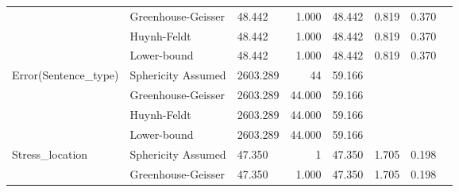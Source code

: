 \documentclass[a4paper]{article}
\begin{document}
\begin{table}[H]
\begin{center}
\begin{tabular}{p{}p{}|l|r|r|r|r|r|}
\cline{2-7}
                                                        & Greenhouse-Geisser & 48.442                                       & 1.000                   & 48.442                           & 0.819                  & 0.370                      \\ 
\cline{2-7}
                                                        & Huynh-Feldt        & 48.442                                       & 1.000                   & 48.442                           & 0.819                  & 0.370                      \\ 
\cline{2-7}
                                                        & Lower-bound        & 48.442                                       & 1.000                   & 48.442                           & 0.819                  & 0.370                      \\ 
\hline
\multirow{4}{*}{Error(Sentence\_type)}                  & Sphericity Assumed & 2603.289                                     & 44                      & 59.166                           & \multicolumn{1}{l|}{~} & \multicolumn{1}{l|}{~}     \\ 
\cline{2-7}
                                                        & Greenhouse-Geisser & 2603.289                                     & 44.000                  & 59.166                           & \multicolumn{1}{l|}{~} & \multicolumn{1}{l|}{~}     \\ 
\cline{2-7}
                                                        & Huynh-Feldt        & 2603.289                                     & 44.000                  & 59.166                           & \multicolumn{1}{l|}{~} & \multicolumn{1}{l|}{~}     \\ 
\cline{2-7}
                                                        & Lower-bound        & 2603.289                                     & 44.000                  & 59.166                           & \multicolumn{1}{l|}{~} & \multicolumn{1}{l|}{~}     \\ 
\hline
\multirow{4}{*}{Stress\_location}                       & Sphericity Assumed & 47.350                                       & 1                       & 47.350                           & 1.705                  & 0.198                      \\ 
\cline{2-7}
                                                        & Greenhouse-Geisser & 47.350                                       & 1.000                   & 47.350                           & 1.705                  & 0.198                      \\ 

\end{tabular}
\end{center}
\end{table}
\end{document}
